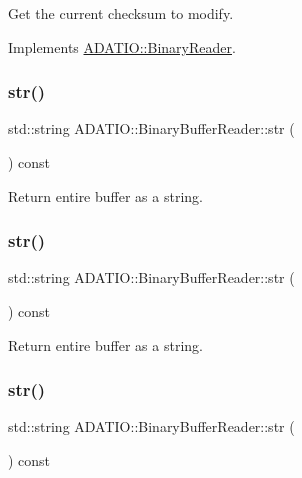 Get the current checksum to modify. 



Implements \mbox{\hyperlink{classADATIO_1_1BinaryReader_a33d291f073bf2e1f71f6bdbe40ce343a}{A\+D\+A\+T\+I\+O\+::\+Binary\+Reader}}.

\mbox{\label{classADATIO_1_1BinaryBufferReader_a1e960fee8100fbe85f706b45870d95e1}} 
\subsubsection{\texorpdfstring{str()}{str()}\hspace{0.1cm}{\footnotesize\ttfamily [1/3]}}
{\footnotesize\ttfamily std\+::string A\+D\+A\+T\+I\+O\+::\+Binary\+Buffer\+Reader\+::str (\begin{DoxyParamCaption}{ }\end{DoxyParamCaption}) const}



Return entire buffer as a string. 

\mbox{\label{classADATIO_1_1BinaryBufferReader_a1e960fee8100fbe85f706b45870d95e1}} 
\subsubsection{\texorpdfstring{str()}{str()}\hspace{0.1cm}{\footnotesize\ttfamily [2/3]}}
{\footnotesize\ttfamily std\+::string A\+D\+A\+T\+I\+O\+::\+Binary\+Buffer\+Reader\+::str (\begin{DoxyParamCaption}{ }\end{DoxyParamCaption}) const}



Return entire buffer as a string. 

\mbox{\label{classADATIO_1_1BinaryBufferReader_a1e960fee8100fbe85f706b45870d95e1}} 
\subsubsection{\texorpdfstring{str()}{str()}\hspace{0.1cm}{\footnotesize\ttfamily [3/3]}}
{\footnotesize\ttfamily std\+::string A\+D\+A\+T\+I\+O\+::\+Binary\+Buffer\+Reader\+::str (\begin{DoxyParamCaption}{ }\end{DoxyParamCaption}) const}



